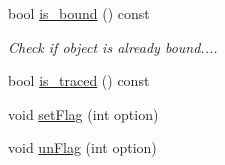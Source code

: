 \begin{DoxyCompactItemize}
bool \hyperlink{class_d_d4hep_1_1_conditions_1_1_interna_1_1_condition_object_a51dd6a1ebeb160b7a3d1346e07fbcf9e}{is\+\_\+bound} () const
\begin{DoxyCompactList}\small\item\em Check if object is already bound.... \end{DoxyCompactList}\item 
bool \hyperlink{class_d_d4hep_1_1_conditions_1_1_interna_1_1_condition_object_af957932641f216e024fd748497ea97bc}{is\+\_\+traced} () const
\item 
void \hyperlink{class_d_d4hep_1_1_conditions_1_1_interna_1_1_condition_object_ae060ad7c29aae54e9c6701db35408155}{set\+Flag} (int option)
\item 
void \hyperlink{class_d_d4hep_1_1_conditions_1_1_interna_1_1_condition_object_ad0e2c621be69101fa71fd96aaff0c15d}{un\+Flag} (int option)
\end{DoxyCompactItemize}
